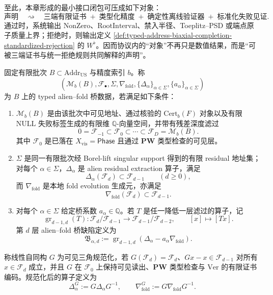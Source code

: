 \begin{proposition}[最小接口闭包]\label{prop:typed-address-biaxial-completion-minimal-interface-closure}
至此，本章形成的最小接口闭包可压成如下对象：
\[
\text{声明}
\quad\rightsquigarrow\quad
\text{三端有限证书}
\;+\;
\text{类型化精度}
\;+\;
\text{确定性离线验证器}
\;+\;
\text{标准化失败见证}.
\]
通过时，系统输出 \(\mathrm{NonZero}\)、\(\mathrm{RootInterval}\)、禁入半径、Toeplitz--PSD 或端点原子质量上界；拒绝时，则输出定义 \ref{def:typed-address-biaxial-completion-standardized-rejection} 的 \(W^{\flat}\)。因而协议内的“对象”不再只是数值结果，而是“可被三端证书与统一拒绝规则共同解释的声明”。
\end{proposition}
\begin{definition}\label{distill:ecalle_resurgence_mould_calculus_and_alien_derivatives-alien_fold_bridge_family-typed-bridge-gate}
固定有限批次 \(B\subset \mathrm{Addr}_{\mathrm{US}}\) 与精度索引 \(b\)。称
\[
(\mathcal M_b(B),\mathcal F_\bullet,\Sigma,\nabla_{\mathrm{fold}},\{\Delta_\alpha\}_{\alpha\in\Sigma},\{a_\alpha\}_{\alpha\in\Sigma})
\]
为 \(B\) 上的 typed alien--fold 桥数据，若满足如下条件：
\begin{enumerate}
  \item \(\mathcal M_b(B)\) 是由该批次中可见地址、通过核验的 \(\mathrm{Cert}_b(F)\) 对象以及有限 \(\mathrm{NULL}\) 失败标签生成的有限维 \(\mathbb Q\)-向量空间，并带有残差深度滤过
  \[
  0=\mathcal F_{-1}\subset \mathcal F_0\subset\cdots\subset \mathcal F_D=\mathcal M_b(B).
  \]
  其中 \(\mathcal F_0\) 是已落在 \(X_{\mathrm{vis}}=\mathsf{Phase}\) 且通过 \(\mathbf{PW}\) 类型检查的可见层。
  \item \(\Sigma\) 是同一有限批次经 Borel-lift singular support 得到的有限 residual 地址集；对每个 \(\alpha\in\Sigma\)，\(\Delta_\alpha\) 是 alien residual extraction 算子，满足
  \[
  \Delta_\alpha(\mathcal F_d)\subset \mathcal F_{d-1}\qquad(d\geq 0),
  \]
  而 \(\nabla_{\mathrm{fold}}\) 是本地 fold evolution 生成元，亦满足
  \[
  \nabla_{\mathrm{fold}}(\mathcal F_d)\subset \mathcal F_{d-1}.
  \]
  \item 对每个 \(\alpha\in\Sigma\) 给定桥系数 \(a_\alpha\in\mathbb Q\)。若 \(T\) 是任一降低一层滤过的算子，记
  \[
  \operatorname{gr}_{d-1,d}(T):\mathcal F_d/\mathcal F_{d-1}\longrightarrow \mathcal F_{d-1}/\mathcal F_{d-2},
  \qquad [x]\longmapsto [Tx].
  \]
  第 \(d\) 层 alien--fold 桥缺陷定义为
  \[
  \mathfrak B_{\alpha,d}:=\operatorname{gr}_{d-1,d}(\Delta_\alpha-a_\alpha\nabla_{\mathrm{fold}}).
  \]
\end{enumerate}
称线性自同构 \(G\) 为可见三角规范化，若 \(G(\mathcal F_d)=\mathcal F_d\)、\(Gx-x\in\mathcal F_{d-1}\) 对所有 \(x\in\mathcal F_d\) 成立，并且 \(G\) 在 \(\mathcal F_0\) 上保持可见读出、\(\mathbf{PW}\) 类型检查与 \(\mathrm{Ver}\) 的有限证书编码。规范化后的算子定义为
\[
\Delta_\alpha^G:=G\Delta_\alpha G^{-1},\qquad \nabla_{\mathrm{fold}}^G:=G\nabla_{\mathrm{fold}}G^{-1}.
\]
\end{definition}

